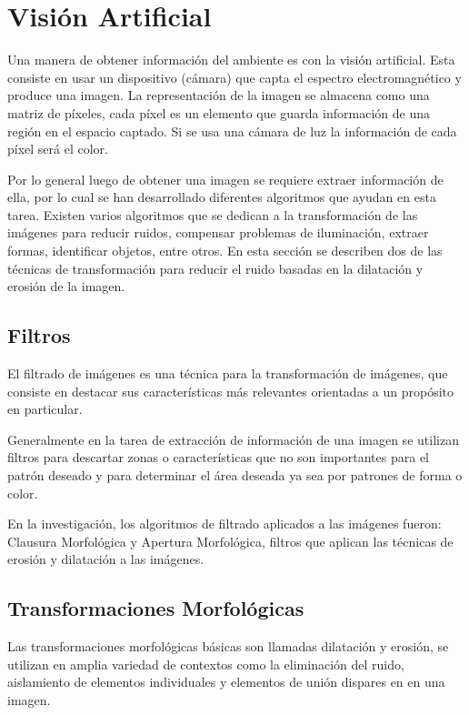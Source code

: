 \section{Visión Artificial} \label{sect:Vision_Artificial}

Una manera de obtener información del ambiente es con la visión artificial. Esta consiste en usar un dispositivo (cámara) que
capta el espectro electromagnético y produce una imagen. La representación de la imagen se almacena como una matriz de píxeles,
cada píxel es un elemento que guarda información de una región en el espacio captado. Si se usa una cámara de luz la información
de cada píxel será el color. \cite{AiRobotics}  

Por lo general luego de obtener una imagen se requiere extraer información de ella, por lo cual se han desarrollado diferentes
algoritmos que ayudan en esta tarea. Existen varios algoritmos que se dedican a la transformación de las imágenes para reducir
ruidos, compensar problemas de iluminación, extraer formas, identificar objetos, entre otros. En esta sección se describen dos
de las técnicas de transformación para reducir el ruido basadas en la dilatación y erosión de la imagen. 

\subsection{Filtros }
El filtrado de imágenes es una técnica para la transformación de imágenes, que consiste en destacar  sus características más relevantes orientadas a un propósito en particular. 

Generalmente en la tarea de extracción de información de una imagen se utilizan filtros para descartar zonas o características que no son importantes para el patrón deseado y para determinar el área deseada ya sea por patrones de forma o color.

En la investigación, los algoritmos de filtrado aplicados a las imágenes fueron: Clausura Morfológica y Apertura Morfológica, filtros que aplican las técnicas de erosión y dilatación a las imágenes.

\subsection{Transformaciones Morfológicas}
Las transformaciones morfológicas básicas son llamadas dilatación y erosión, se utilizan en 
amplia variedad de contextos como la eliminación del ruido, aislamiento de elementos individuales y elementos de unión dispares
en en una imagen.\cite{BookOpenCv}

